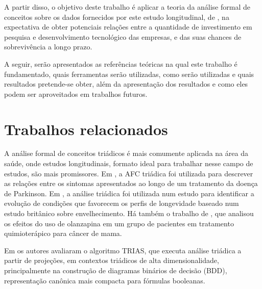 \documentclass[12pt]{article}
\begin{document}
A partir disso, o objetivo deste trabalho é aplicar a teoria da análise formal de conceitos sobre os dados fornecidos por este estudo longitudinal, de \cite{KIM2019103967}, na expectativa de obter potenciais relações entre a quantidade de investimento em pesquisa e desenvolvimento tecnológico das empresas, e das suas chances de sobrevivência a longo prazo.

A seguir, serão apresentados as referências teóricas na qual este trabalho é fundamentado, quais ferramentas serão utilizadas, como serão utilizadas e quais resultados pretende-se obter, além da apresentação dos resultados e como eles podem ser aproveitados em trabalhos futuros.

\section{Trabalhos relacionados} \label{sec:firstpage}

A análise formal de conceitos triádicos é mais comumente aplicada na área da saúde, onde estudos longitudinais, formato ideal para trabalhar nesse campo de estudos, são mais promissores. Em \cite{mendes:21}, a AFC triádica foi utilizada para descrever as relações entre os sintomas apresentados ao longo de um tratamento da doença de Parkinson. Em \cite{noronha:21}, a análise triádica foi utilizada num estudo para identificar a evolução de condições que favorecem os perfis de longevidade baseado num estudo britânico sobre envelhecimento. Há também o trabalho de \cite{ferreira:21}, que analisou os efeitos do uso de olanzapina em um grupo de pacientes em tratamento quimioterápico para câncer de mama.



Em \cite{kaio:21} os autores avaliaram o algoritmo TRIAS, que executa análise triádica a partir de projeções, em contextos triádicos de alta dimensionalidade, principalmente na construção de diagramas binários de decisão (BDD), representação canônica mais compacta para fórmulas booleanas.
\end{document}
